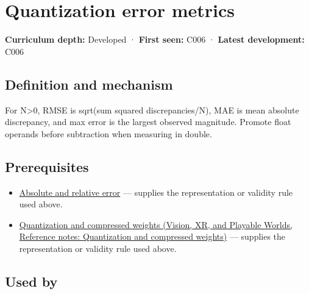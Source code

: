 \hypertarget{appendix-537171d69d27}{}\label{referencestart:appendix-537171d69d27}
\section{Quantization error metrics}\label{appendix-537171d69d27-quantization-error-metrics}

\hypertarget{appendix-537171d69d27-quantization-error-metrics}{}

\textbf{Curriculum depth:} Developed · \textbf{First seen:} C006 · \textbf{Latest development:} C006

\begin{allmightroledefinition}

\subsection{Definition and mechanism}\label{appendix-537171d69d27-definition-and-mechanism}

\hypertarget{appendix-537171d69d27-definition-and-mechanism}{}

For N\textgreater0, RMSE is sqrt(sum squared discrepancies/N), MAE is mean absolute discrepancy, and max error is the largest observed magnitude. Promote float operands before subtraction when measuring in double.

\end{allmightroledefinition}

\subsection{Prerequisites}\label{appendix-537171d69d27-prerequisites}

\hypertarget{appendix-537171d69d27-prerequisites}{}

\begin{itemize}
\tightlist
\item
  \hyperref[appendix-3ae74e89b4e6]{Absolute and relative error} --- supplies the representation or validity rule used above.
\item
  \href{../07-Vision-XR-and-Playable-Worlds/main.pdf\#nameddest=appendix-fdc7879e8bf2}{Quantization and compressed weights (Vision, XR, and Playable Worlds, Reference notes: Quantization and compressed weights)} --- supplies the representation or validity rule used above.
\end{itemize}

\subsection{Used by}\label{appendix-537171d69d27-used-by}

